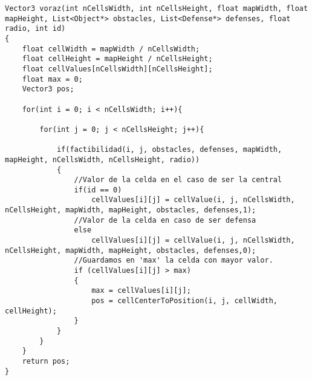\begin{lstlisting}
Vector3 voraz(int nCellsWidth, int nCellsHeight, float mapWidth, float mapHeight, List<Object*> obstacles, List<Defense*> defenses, float radio, int id)
{
    float cellWidth = mapWidth / nCellsWidth;
    float cellHeight = mapHeight / nCellsHeight; 
    float cellValues[nCellsWidth][nCellsHeight];
    float max = 0;
    Vector3 pos;

    for(int i = 0; i < nCellsWidth; i++){
        
        for(int j = 0; j < nCellsHeight; j++){
            
            if(factibilidad(i, j, obstacles, defenses, mapWidth, mapHeight, nCellsWidth, nCellsHeight, radio))
            {             
                //Valor de la celda en el caso de ser la central
                if(id == 0)                
                    cellValues[i][j] = cellValue(i, j, nCellsWidth, nCellsHeight, mapWidth, mapHeight, obstacles, defenses,1);           
                //Valor de la celda en caso de ser defensa
                else
                    cellValues[i][j] = cellValue(i, j, nCellsWidth, nCellsHeight, mapWidth, mapHeight, obstacles, defenses,0);
                //Guardamos en 'max' la celda con mayor valor.
                if (cellValues[i][j] > max)
                {
                    max = cellValues[i][j];
                    pos = cellCenterToPosition(i, j, cellWidth, cellHeight);
                }
            }
        }
    }
    return pos;
}
\end{lstlisting}